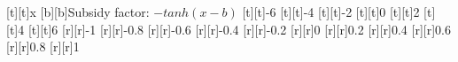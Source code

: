 %
%
\begin{psfrags}%
\psfragscanon%
%
[t][t]{x}%
[b][b]{Subsidy factor: $-tanh(x-b)$}%
%
[t][t]{-6}%
[t][t]{-4}%
[t][t]{-2}%
[t][t]{0}%
[t][t]{2}%
[t][t]{4}%
[t][t]{6}%
%
[r][r]{-1}%
[r][r]{-0.8}%
[r][r]{-0.6}%
[r][r]{-0.4}%
[r][r]{-0.2}%
[r][r]{0}%
[r][r]{0.2}%
[r][r]{0.4}%
[r][r]{0.6}%
[r][r]{0.8}%
[r][r]{1}%
%
%
\end{psfrags}%
%
